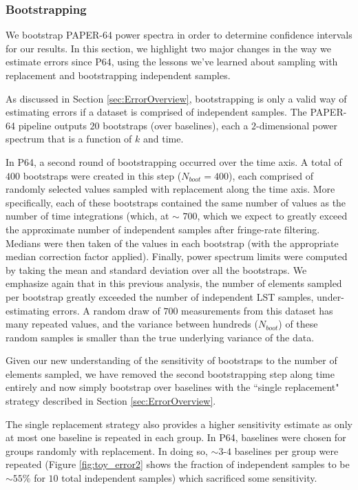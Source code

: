 \documentclass[preprint2,numberedappendix,tighten]{aastex6}  %
\begin{document}
\subsubsection{Bootstrapping}
\label{sec:Boot}

We bootstrap PAPER-64 power spectra in order to determine confidence intervals for our results. In this section, we highlight 
two major changes in the way we estimate errors since P64, using the lessons we've learned about sampling with replacement 
and bootstrapping independent samples.

As discussed in Section \ref{sec:ErrorOverview}, bootstrapping is only a valid way of estimating errors if a dataset is comprised 
of independent samples. The PAPER-64 pipeline outputs $20$ bootstraps (over baselines), each a $2$-dimensional power 
spectrum that is a function of $k$ and time. 

In P64, a second round of bootstrapping occurred over the time axis. A total of $400$ bootstraps were created in this step 
($N_{boot} = 400$), each comprised of randomly selected values sampled with replacement along the time axis. More 
specifically, each of these bootstraps contained the same number of values as the number of time integrations (which, at $\sim$
$700$, which we expect to greatly exceed the approximate number of independent samples after fringe-rate filtering.
Medians were then taken of the values in each bootstrap (with the appropriate median correction factor applied). Finally, power 
spectrum limits were computed by taking the mean and standard deviation over all the bootstraps. We emphasize again that in 
this previous analysis, the number of elements sampled per bootstrap greatly 
exceeded the number of independent LST samples, under-estimating errors. A random draw of $700$ 
measurements from this dataset has many repeated values, and the variance between hundreds ($N_{boot}$) of these random 
samples is smaller than the true underlying variance of the data. 

Given our new understanding of the sensitivity of bootstraps to the number of elements sampled, we have removed the second 
bootstrapping step along time entirely and now simply bootstrap over baselines with the ``single replacement" strategy 
described in Section \ref{sec:ErrorOverview}.

The single replacement strategy also provides a higher sensitivity estimate as only at most one baseline is repeated in each 
group. In P64, baselines were chosen for groups randomly with replacement. In doing so, $\sim$$3$-$4$ baselines per group 
were repeated (Figure \ref{fig:toy_error2} shows the fraction of independent samples to be $\sim$$55\%$ for $10$ total 
independent samples) which sacrificed some sensitivity. 
\end{document}
